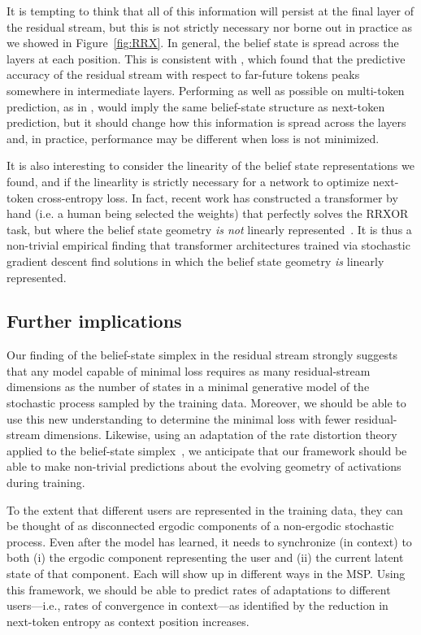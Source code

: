 \documentclass{article}
\begin{document}
It is tempting to think that all of this information will persist at the final layer of the residual stream, but this is not strictly necessary nor borne out in practice as we showed in Figure~\ref{fig:RRX}.  In general, the belief state is spread across the layers at each position.  This is consistent with 
\cite{Pal23_Future},
which found that the %
predictive accuracy
of the residual stream with respect to far-future tokens peaks somewhere in intermediate layers.
Performing as well as possible on multi-token prediction, as in 
\cite{Gloeckle24_Better}, 
would imply the same belief-state structure as next-token prediction, 
but it should change how this information is spread across the layers and, in practice, performance may be different when loss is not minimized.

It is also interesting to consider the linearity of the belief state representations we found, and if the linearlity is strictly necessary for a network to optimize next-token cross-entropy loss. In fact, recent work has constructed a transformer by hand (i.e. a human being selected the weights) that perfectly solves the RRXOR task, but where the belief state geometry \textit{is not} linearly represented~\citep{GoldsteinHand}. It is thus a non-trivial empirical finding that transformer architectures trained via stochastic gradient descent find solutions in which the belief state geometry \textit{is} linearly represented.

\subsection{Further implications}

Our finding of the belief-state simplex in the residual stream strongly suggests 
that any model capable of minimal loss requires as many residual-stream dimensions 
as the number of states in a minimal generative model of the stochastic process sampled by the training data.
Moreover, we should be able to use this new understanding to determine the minimal loss with fewer residual-stream dimensions.  Likewise, using an adaptation of the rate distortion theory applied to the belief-state simplex~\citep{Marz17a}, we anticipate that our framework should be able to make non-trivial predictions about the evolving geometry of activations during training.

To the extent that different users are represented in the training data, they can be thought of as disconnected ergodic components of a non-ergodic stochastic process.  Even after the model has learned, it needs to synchronize (in context) to both (i) the ergodic component representing the user and (ii) the current latent state of that component.  Each will show up in different ways in the MSP.  
Using this framework, we should be able to predict rates of adaptations to different users---i.e., rates of convergence in context---as identified by the reduction in next-token entropy as context position increases.
\end{document}
